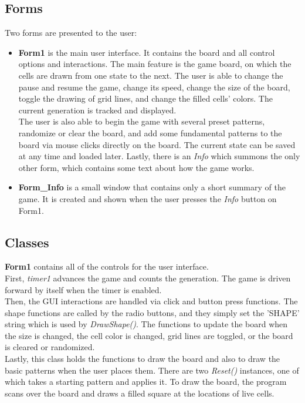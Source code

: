 \documentclass[12pt, letterpaper]{article}
\begin{document}
\subsection*{Forms}
Two forms are presented to the user:
\begin{itemize}
\item{\textbf{Form1} is the main user interface. It contains the board and all control options and interactions. The main feature is the game board, on which the cells are drawn from one state to the next. The user is able to change the pause and resume the game, change its speed, change the size of the board, toggle the drawing of grid lines, and change the filled cells' colors. The current generation is tracked and displayed.
\\\-\hspace{0.5cm} The user is also able to begin the game with several preset patterns, randomize or clear the board, and add some fundamental patterns to the board via mouse clicks directly on the board. The current state can be saved at any time and loaded later. Lastly, there is an \textit{Info} which summons the only other form, which contains some text about how the game works.}

\item{\textbf{Form\_Info} is a small window that contains only a short summary of the game. It is created and shown when the user presses the \textit{Info} button on Form1.}
\end{itemize}

\subsection*{Classes}
\textbf{Form1} contains all of the controls for the user interface. \\\-\hspace{0.5cm}First, \textit{timer1} advances the game and counts the generation. The game is driven forward by itself when the timer is enabled.
\\\-\hspace{0.5cm}Then, the GUI interactions are handled via click and button press functions. The shape functions are called by the radio buttons, and they simply set the 'SHAPE' string which is used by \textit{DrawShape()}. The functions to update the board when the size is changed, the cell color is changed, grid lines are toggled, or the board is cleared or randomized.
\\\-\hspace{0.5cm}Lastly, this class holds the functions to draw the board and also to draw the basic patterns when the user places them. There are two \textit{Reset()} instances, one of which takes a starting pattern and applies it. To draw the board, the program scans over the board and draws a filled square at the locations of live cells.
\end{document}

